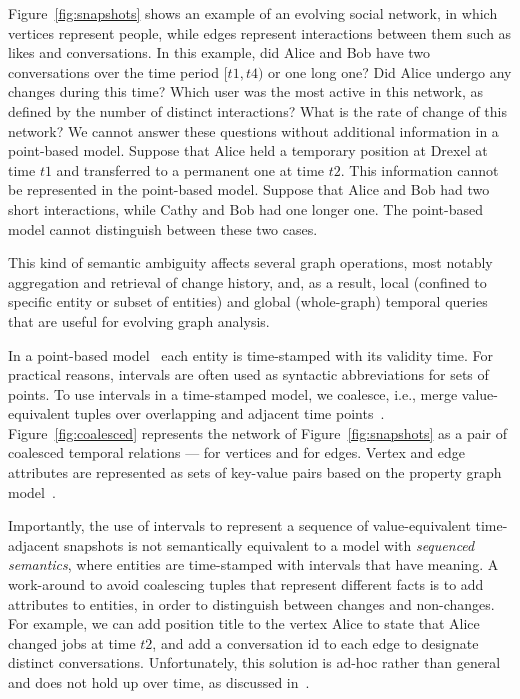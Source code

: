 Figure~\ref{fig:snapshots} shows an example of an evolving social
network, in which vertices represent people, while edges represent
interactions between them such as likes and conversations.  In this
example, did Alice and Bob have two conversations over the time period
$[t1, t4)$ or one long one?  Did Alice undergo any changes during this
  time?  Which user was the most active in this network, as defined by
  the number of distinct interactions? What is the rate of change of
  this network?  We cannot answer these questions without additional
  information in a point-based model.  Suppose that Alice held a
  temporary position at Drexel at time $t1$ and transferred to a
  permanent one at time $t2$.  This information cannot be represented
  in the point-based model.  Suppose that Alice and Bob had two short
  interactions, while Cathy and Bob had one longer one.  The
  point-based model cannot distinguish between these two cases.

This kind of semantic ambiguity affects several graph operations, most
notably aggregation and retrieval of change history, and, as a result,
local (confined to specific entity or subset of entities) and global
(whole-graph) temporal queries that are useful for evolving graph
analysis.

In a point-based model~\cite{Toman2009} each entity is time-stamped
with its validity time.  For practical reasons, intervals are often
used as syntactic abbreviations for sets of points.  To use intervals
in a time-stamped model, we coalesce, i.e., merge value-equivalent
tuples over overlapping and adjacent time
points~\cite{DBLP:conf/vldb/BohlenSS96}.  Figure~\ref{fig:coalesced}
represents the network of Figure~\ref{fig:snapshots} as a pair of
coalesced temporal relations ---  for vertices and 
for edges.  Vertex and edge attributes are represented as sets of
key-value pairs based on the property graph model~\cite{GraphDB}.

Importantly, the use of intervals to represent a sequence of
value-equivalent time-adjacent snapshots is not semantically
equivalent to a model with {\em sequenced semantics}, where entities
are time-stamped with intervals that have meaning.\eat{ Note that
  Alice shows no changes during the whole time interval, with a single
  tuple over $[t1, t4)$.  Similarly, two interactions between Alice
    and Bob are coalesced into one.} A work-around to avoid coalescing
  tuples that represent different facts is to add attributes to
  entities, in order to distinguish between changes and non-changes.
  For example, we can add position title to the vertex Alice to state
  that Alice changed jobs at time $t2$, and add a conversation id to
  each edge to designate distinct conversations.  Unfortunately, this
  solution is ad-hoc rather than general and does not hold up over
  time, as discussed in~\cite{Bohlen1998}.


